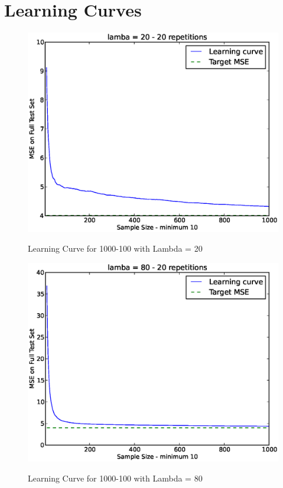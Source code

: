 \documentclass[12pt]{article}
\begin{document}
\section{Learning Curves}
\begin{figure}[h]
\includegraphics[height=.5\textheight]{2/1000-100-20-20-problem2.eps}
\label{fig:2-20}
\caption{Learning Curve for 1000-100 with Lambda = 20}
\end{figure}
\begin{figure}[h]
\includegraphics[height=.5\textheight]{2/1000-100-80-20-problem2.eps}
\label{fig:2-80}
\caption{Learning Curve for 1000-100 with Lambda = 80}
\end{figure}
\end{document}

